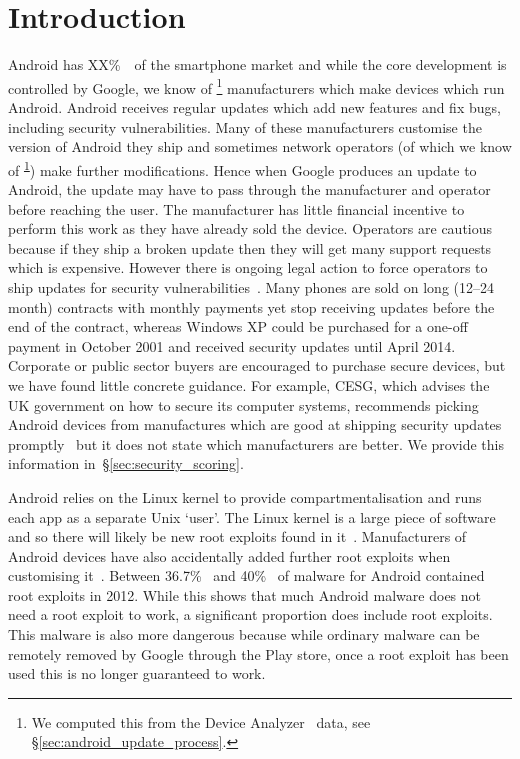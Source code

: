 \documentclass[conference,a4paper,twoside]{IEEEtran}
\let\OldTodo\todo
\renewcommand{\todo}{\OldTodo[inline]}
\newcommand{\todolater}[1]{}%
\newcommand{\da}{Device Analyzer}
\newcommand{\dafoot}{\textsuperscript{\ref{foot:dadata}}}
\newcommand{\percMarketShare}{XX\%~\cite{TODO}}
\begin{document}
\section{Introduction}
Android has \percMarketShare\ of the smartphone market and while the core development is controlled by Google, we know of \daNumManufacturers\footnote{\label{foot:dadata}We computed this from the \da~\cite{Wagner2013} data, see \S\ref{sec:android_update_process}.} manufacturers which make devices which run Android.
Android receives regular updates  which add new features and fix bugs, including security vulnerabilities.
Many of these manufacturers customise the version of Android they ship and sometimes network operators (of which we know of \daNumOperators\dafoot) make further modifications.
Hence when Google produces an update to Android, the update may have to pass through the manufacturer and operator before reaching the user.
The manufacturer has little financial incentive to perform this work as they have already sold the device.
Operators are cautious because if they ship a broken update then they will get many support requests which is expensive.
However there is ongoing legal action to force operators to ship updates for security vulnerabilities~\cite{Soghoian2013}.\todolater{Check on the status of this legal action}
Many phones are sold on long (12--24 month) contracts with monthly payments yet stop receiving updates before the end of the contract,\todolater{Is there a survey of the distribution of contract lengths and phone purchase methods?} whereas Windows XP could be purchased for a one-off payment in October 2001 and received security updates until April 2014.
Corporate or public sector buyers are encouraged to purchase secure devices, but we have found little concrete guidance. For example, CESG, which advises the UK government on how to secure its computer systems, recommends picking Android devices from manufactures which are good at shipping security updates promptly~\cite{CESG2013} but it does not state which manufacturers are better.\todolater{Which other advisory organisations give that advice?}
We provide this information in~\S\ref{sec:security_scoring}.

Android relies on the Linux kernel to provide compartmentalisation and runs each app as a separate Unix `user'.
The Linux kernel is a large piece of software and so there will likely be new root exploits found in it~\cite{TODO}.
Manufacturers of Android devices have also accidentally added further root exploits when customising it~\cite{Grace2012}.
Between 36.7\%~\cite{Zhou2012b} and 40\%~\cite{Zhou2012a} of malware for Android contained root exploits in 2012.
While this shows that much Android malware does not need a root exploit to work, a significant proportion does include root exploits.
This malware is also more dangerous because while ordinary malware can be remotely removed by Google through the Play store, once a root exploit has been used this is no longer guaranteed to work.
\end{document}
